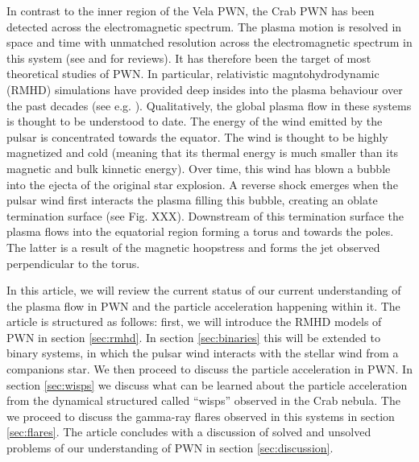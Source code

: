 In contrast to the inner region of the Vela PWN, the Crab PWN has been detected across the electromagnetic spectrum. The plasma motion is resolved in space and time with unmatched resolution across the electromagnetic spectrum in this system (see \citet{Hester_2008} and \citet{BuehlerBlandford2013a} for reviews). It has therefore been the target of most theoretical studies of PWN. In particular, relativistic magntohydrodynamic (RMHD) simulations have provided deep insides into the plasma behaviour over the past decades (see e.g.  \citet{Komissarov_2004,Del_Zanna_2006,Porth_2013}). Qualitatively, the global plasma flow in these systems is thought to be understood to date. The energy of the wind emitted by the pulsar is concentrated towards the equator. The wind is thought to be highly magnetized and cold (meaning that its thermal energy is much smaller than its magnetic and bulk kinnetic energy). Over time, this wind has blown a bubble into the ejecta of the original star explosion. A reverse shock emerges when the pulsar wind first interacts the plasma filling this bubble, creating an oblate termination surface (see Fig. XXX). Downstream of this termination surface the plasma flows into the equatorial region forming a torus and towards the poles. The latter is a result of the magnetic hoopstress and forms the jet observed perpendicular to the torus.

In this article, we will review the current status of our current understanding of the plasma flow in PWN and the particle acceleration happening within it.  The article is structured as follows: first, we will introduce the RMHD models of PWN in section \ref{sec:rmhd}. In section \ref{sec:binaries} this will be extended to binary systems, in which the pulsar wind interacts with the stellar wind from a companions star. We then proceed to discuss the particle acceleration in PWN. In section \ref{sec:wisps} we discuss what can be learned about the particle acceleration from the dynamical structured called ``wisps'' observed in the Crab nebula. The we proceed to discuss the gamma-ray flares observed in this systems in section \ref{sec:flares}. The article concludes with a discussion of solved and unsolved problems of our understanding of PWN in section \ref{sec:discussion}.